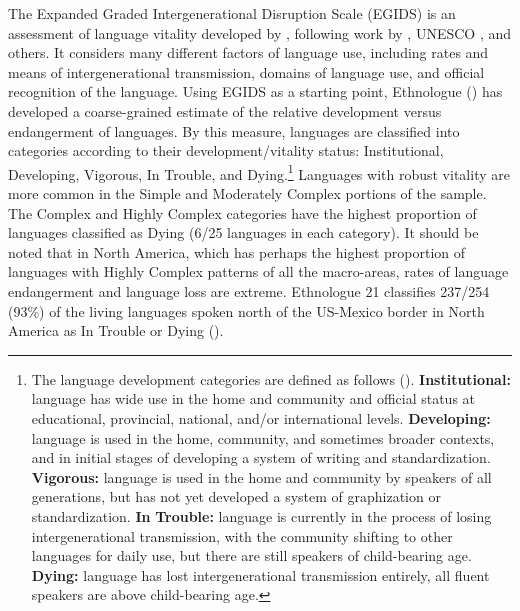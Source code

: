  The Expanded Graded Intergenerational Disruption Scale (EGIDS) is an assessment of language vitality developed by \citet{LewisSimons2010}, following work by \citet{Fishman1991}, UNESCO \citep{BrenzingerEtAl2003}, and others. It considers many different factors of language use, including rates and means of intergenerational transmission, domains of language use, and official recognition of the language. Using EGIDS as a starting point, Ethnologue (\citealt{SimonsFennig2018}) has developed a coarse-grained estimate of the relative development versus endangerment of languages. By this measure, languages are classified into categories according to their development/vitality status: Institutional, Developing, Vigorous, In Trouble, and Dying.\footnote{\textrm{The language development categories are defined as follows (\citealt{SimonsFennig2018}).} \textrm{\textbf{Institutional:} }\textrm{language has wide use in the home and community and official status at educational, provincial, national, and/or international levels.} \textrm{\textbf{Developing:} }\textrm{language is used in the home, community, and sometimes broader contexts, and in initial stages of developing a system of writing and standardization.}\textrm{ }\textrm{\textbf{Vigorous:} }\textrm{language is used in the home and community by speakers of all generations, but has not yet developed a system of graphization or standardization}\textrm{. }\textrm{\textbf{In} \textbf{Trouble:}} \textrm{language is currently in the process of losing intergenerational transmission, with the community shifting to other languages for daily use, but there are still speakers of child-bearing age.}\textrm{ }\textrm{\textbf{Dying:}} \textrm{language has lost intergenerational transmission entirely, all fluent speakers are above child-bearing age.}} Languages with robust vitality are more common in the Simple and Moderately Complex portions of the sample. The Complex and Highly Complex categories have the highest proportion of languages classified as Dying (6/25 languages in each category). It should be noted that in North America, which has perhaps the highest proportion of languages with Highly Complex patterns of all the macro-areas, rates of language endangerment and language loss are extreme. Ethnologue 21 classifies 237/254 (93\%) of the living languages spoken north of the US-Mexico border in North America as In Trouble or Dying (\citealt{SimonsFennig2018}). 

